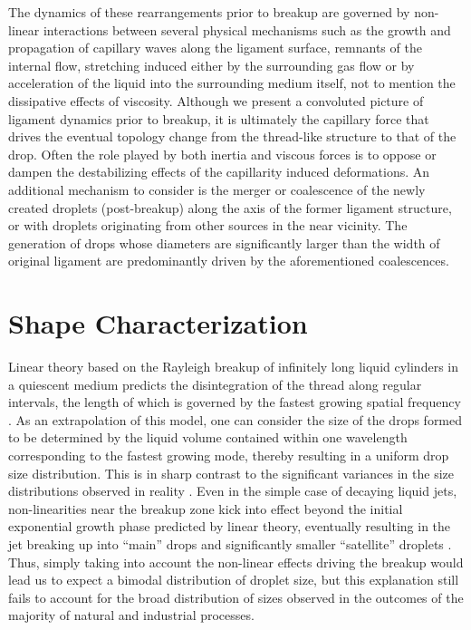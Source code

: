 The dynamics of these rearrangements prior to breakup are 
governed by non-linear interactions between several 
physical mechanisms such as the growth and propagation of capillary 
waves along the ligament surface, remnants of the internal flow, 
stretching induced either by the surrounding gas flow or by 
acceleration of the liquid into the surrounding medium itself,
not to mention the dissipative effects of viscosity.  
Although we present a convoluted picture of ligament dynamics prior
to breakup, it is ultimately the capillary force that drives the 
eventual topology change from the thread-like structure to that of the drop. 
Often the role played by both inertia and viscous forces is to oppose 
or dampen the destabilizing effects of the capillarity induced deformations.   
An additional mechanism to consider is the merger or coalescence of the 
newly created droplets (post-breakup) along the axis of the former ligament
structure, or with droplets originating from other sources in the near vicinity. 
The generation of drops whose diameters are significantly larger than the 
width of original ligament are predominantly driven by the aforementioned coalescences.  

\section{Shape Characterization}

Linear theory based on the Rayleigh breakup of infinitely
long liquid cylinders in a quiescent medium predicts the disintegration
of the thread along regular intervals, the length of which is governed
by the fastest growing spatial frequency \cite{rayleigh1879a,rayleigh1879b}. 
As an extrapolation of this model, one can consider the size of the drops formed 
to be determined by the liquid volume contained within one wavelength corresponding 
to the fastest growing mode, thereby resulting in a uniform drop size distribution. 
This is in sharp contrast to the significant variances in the size distributions
observed in reality .  
Even in the simple case of decaying liquid jets, 
non-linearities near the breakup zone kick into effect beyond
the initial exponential growth phase predicted by linear theory, 
eventually resulting in the jet breaking up into 
``main'' drops and significantly smaller ``satellite'' droplets \cite{rutland1971non}.
Thus, simply taking into account the non-linear effects driving the breakup would
lead us to expect a bimodal distribution of droplet size, but this explanation 
still fails to account for the broad distribution of sizes observed in 
the outcomes of the majority of natural \cite{nature} and industrial \cite{industrial} processes. 


